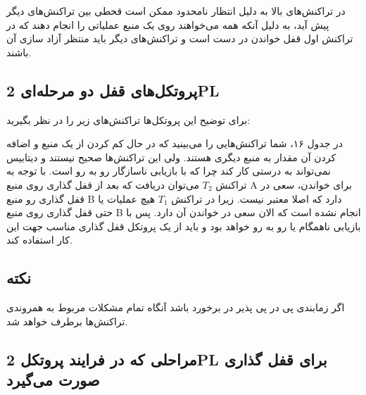 \documentclass[a4paper]{article}
\begin{document}
در تراکنش‌های بالا به دلیل انتظار نامحدود ممکن است قحطی بین تراکنش‌های دیگر پیش
آید، به دلیل آنکه همه می‌خواهند روی یک منبع عملیاتی را انجام دهند که در تراکنش
اول قفل خواندن در دست است و تراکنش‌های دیگر باید منتظر آزاد سازی آن باشند.

\newpage

\subsection{پروتکل‌های قفل دو مرحله‌ای 2PL}

برای توضیح این پروتکل‌ها تراکنش‌های زیر را در نظر بگیرید:

\begin{LTR}
    \begin{table}[h]
        \begin{RTL}
            \caption{زمانبندی $S_{5}$}
        \end{RTL}
        \centering
    \end{table}
\end{LTR}

در جدول ۱۶، شما تراکنش‌هایی را می‌بینید که در حال کم کردن از یک منبع و اضافه
کردن آن مقدار به منبع دیگری هستند. ولی این تراکنش‌ها صحیح نیستند و دیتابیس
نمی‌تواند به درستی کار کند چرا که با بازیابی ناسازگار رو به رو است. با توجه به
تراکنش $T_{2}$ می‌توان دریافت که بعد از قفل گذاری روی منبع A برای خواندن، سعی در
قفل گذاری رو منبع B دارد که اصلا معتبر نیست. زیرا در تراکنش $T_{1}$ هیچ عملیات
یا حتی قفل گذاری روی منبع B انجام نشده است که الان سعی در خواندن آن دارد. پس با
بازیابی ناهمگام یا  رو به رو خواهد بود و باید از یک
پروتکل قفل گذاری مناسب جهت این کار استفاده کند.

\subsection*{نکته}

اگر زمابندی پی در پی پذیر در برخورد باشد آنگاه تمام مشکلات مربوط به
همروندی تراکنش‌ها برطرف خواهد شد.

\subsection{مراحلی که در فرایند پروتکل 2PL برای قفل گذاری صورت می‌گیرد}
\end{document}
